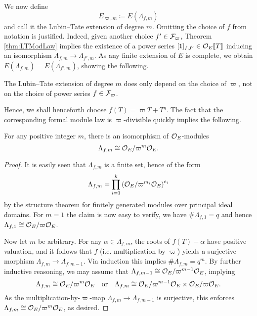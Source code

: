 \documentclass[../main.tex]{subfiles}
\begin{document}
We now define 
\begin{equation*}
  E_{\varpi, m} \coloneq E(\Lambda_{f, m})
\end{equation*}
and call it the Lubin--Tate extension of degree $m$. 
Omitting the choice of $f$ from notation is justified. Indeed, given 
another choice $f' \in \mathcal{F}_\varpi$, Theorem \ref{thm:LTModLaw} implies the 
existence of a power series $[1]_{f,f'} \in \mathcal{O}_E\llbracket T \rrbracket$ inducing an
isomorphism $\Lambda_{f,m} \to \Lambda_{f',m}$. As any finite extension of $E$
is complete, we obtain $E(\Lambda_{f,m}) = E(\Lambda_{f',m})$, showing the following.
\begin{lem}\label{lem:FiniteLTExtensionIndepOfF}
  The Lubin--Tate extension of degree $m$ does only depend on the choice of $\varpi$,
  not on the choice of power series $f \in \mathcal{F}_\varpi$. 
\end{lem}

Hence, we shall henceforth choose $f(T) = \varpi T + T^q$. 
The fact that the corresponding formal module law is $\varpi$-divisible quickly 
implies the following.
\begin{lem}\label{lem:StructureOfLambdamf}
  For any positive integer $m$, there is an isomorphism of $\mathcal{O}_E$-modules
  \begin{equation*}
    \Lambda_{f,m} \cong \mathcal{O}_E/\varpi^m\mathcal{O}_E.
  \end{equation*}
\begin{proof}
  It is easily seen that $\Lambda_{f,m}$ is a finite set, hence of the form
  \begin{equation*}
    \Lambda_{f,m} = \prod_{i = 1}^k \left(\mathcal{O}_E/\varpi^{m_i} \mathcal{O}_E \right)^{e_i}
  \end{equation*}
  by the structure theorem for finitely generated modules over principal ideal domains.
  For $m=1$ the claim is now easy to verify, we have $\# \Lambda_{f,1} = q$ and 
  hence $\Lambda_{f,1} \cong \mathcal{O}_E/\varpi\mathcal{O}_E$.

  Now let $m$ be arbitrary. For any $\alpha \in \Lambda_{f,m}$, the roots of
  $f(T) - \alpha$ have positive valuation, and it follows that $f$ (i.e. multiplication
  by $\varpi$) yields a
  surjective morphism $\Lambda_{f,m} \to \Lambda_{f,m-1}$. Via induction this
  implies $\# \Lambda_{f,m} = q^m$.
  By further inductive reasoning, we may assume that 
  $\Lambda_{f,m-1} \cong \mathcal{O}_E/\varpi^{m-1}\mathcal{O}_E$,  implying
  \begin{equation*}
    \Lambda_{f,m} \cong \mathcal{O}_E/\varpi^{m}\mathcal{O}_E \quad \text{or} \quad 
    \Lambda_{f,m} \cong \mathcal{O}_E/\varpi^{m-1}\mathcal{O}_E \times \mathcal{O}_E/\varpi \mathcal{O}_E.
  \end{equation*}
  As the multiplication-by-$\varpi$-map $\Lambda_{f,m} \to \Lambda_{f,m-1}$ is
  surjective, this enforces $\Lambda_{f,m} \cong \mathcal{O}_E/\varpi^m\mathcal{O}_E$, as desired.
\end{proof}
\end{lem}
\end{document}
